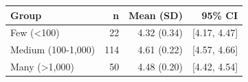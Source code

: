 \begin{tabular}{lrrr}
\toprule
Group & n & Mean (SD) & 95\% CI \\
\midrule
Few (\textless{}100) & 22 & 4.32 (0.34) & [4.17, 4.47] \\
Medium (100-1,000) & 114 & 4.61 (0.22) & [4.57, 4.66] \\
Many (\textgreater{}1,000) & 50 & 4.48 (0.20) & [4.42, 4.54] \\
\bottomrule
\end{tabular}
